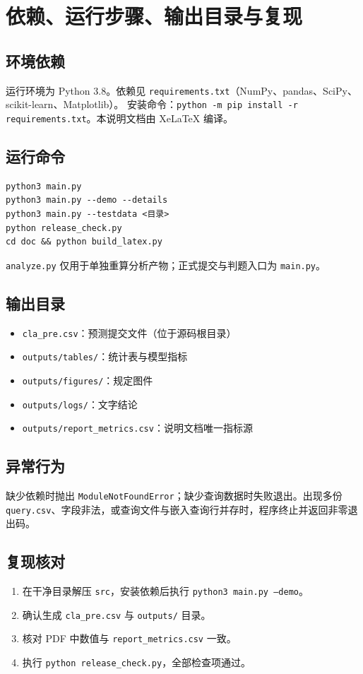 \documentclass[UTF8,a4paper,zihao=-4]{ctexart}
\begin{document}
\section{依赖、运行步骤、输出目录与复现}
\subsection*{环境依赖}
运行环境为 Python 3.8。依赖见 \texttt{requirements.txt}（NumPy、pandas、SciPy、scikit-learn、Matplotlib）。
安装命令：\texttt{python -m pip install -r requirements.txt}。本说明文档由 XeLaTeX 编译。

\subsection*{运行命令}
\begin{verbatim}
python3 main.py
python3 main.py --demo --details
python3 main.py --testdata <目录>
python release_check.py
cd doc && python build_latex.py
\end{verbatim}
\texttt{analyze.py} 仅用于单独重算分析产物；正式提交与判题入口为 \texttt{main.py}。

\subsection*{输出目录}
\begin{itemize}
  \item \texttt{cla\_pre.csv}：预测提交文件（位于源码根目录）
  \item \texttt{outputs/tables/}：统计表与模型指标
  \item \texttt{outputs/figures/}：规定图件
  \item \texttt{outputs/logs/}：文字结论
  \item \texttt{outputs/report\_metrics.csv}：说明文档唯一指标源
\end{itemize}

\subsection*{异常行为}
缺少依赖时抛出 \texttt{ModuleNotFoundError}；缺少查询数据时失败退出。出现多份 \texttt{query.csv}、字段非法，或查询文件与嵌入查询行并存时，程序终止并返回非零退出码。

\subsection*{复现核对}
\begin{enumerate}
  \item 在干净目录解压 \texttt{src}，安装依赖后执行 \texttt{python3 main.py --demo}。
  \item 确认生成 \texttt{cla\_pre.csv} 与 \texttt{outputs/} 目录。
  \item 核对 PDF 中数值与 \texttt{report\_metrics.csv} 一致。
  \item 执行 \texttt{python release\_check.py}，全部检查项通过。
\end{enumerate}
\end{document}
